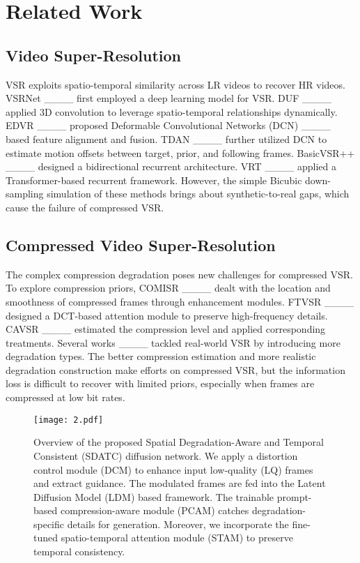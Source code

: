 \section{Related Work}
\subsection{Video Super-Resolution}
VSR exploits spatio-temporal similarity across LR videos to recover HR videos. %
VSRNet ____ first employed a deep learning model for VSR. DUF ____ applied 3D convolution to leverage spatio-temporal relationships dynamically. EDVR ____ proposed Deformable Convolutional Networks (DCN) ____ based feature alignment and fusion. TDAN ____ further utilized DCN to estimate motion offsets between target, prior, and following frames. BasicVSR++ ____ designed a bidirectional recurrent architecture. VRT ____ applied a Transformer-based recurrent framework. However, the simple Bicubic down-sampling simulation of these methods brings about synthetic-to-real gaps, which cause the failure of compressed VSR.

\subsection{Compressed Video Super-Resolution}
The complex compression degradation poses new challenges for compressed VSR. To explore compression priors, COMISR ____ dealt with the location and smoothness of compressed frames through enhancement modules. FTVSR ____ designed a DCT-based attention module to preserve high-frequency details. CAVSR ____ estimated the compression level and applied corresponding treatments. Several works ____ tackled real-world VSR by introducing more degradation types. The better compression estimation and more realistic degradation construction make efforts on compressed VSR, but the information loss is difficult to recover with limited priors, especially when frames are compressed at low bit rates.

\begin{figure*}[!t]
\centering
\texttt{[image: 2.pdf]}
\setlength{\belowcaptionskip}{-8pt}
\caption{Overview of the proposed Spatial Degradation-Aware and Temporal Consistent (SDATC) diffusion network. We apply a distortion control module (DCM) to enhance input low-quality (LQ) frames and extract guidance. The modulated frames are fed into the Latent Diffusion Model (LDM) based framework. The trainable prompt-based compression-aware module (PCAM) catches degradation-specific details for generation. Moreover, we incorporate the fine-tuned spatio-temporal attention module (STAM) to preserve temporal consistency.}
\label{fig_2}
\end{figure*}

